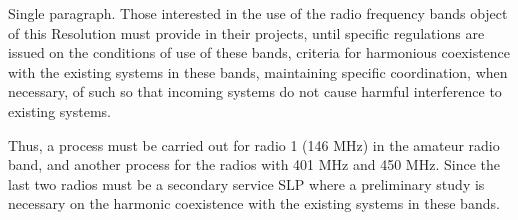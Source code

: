 Single paragraph. Those interested in the use of the radio frequency bands object of this Resolution must provide in their projects, until specific regulations are issued on the conditions of use of these bands, criteria for harmonious coexistence with the existing systems in these bands, maintaining specific coordination, when necessary, of such so that incoming systems do not cause harmful interference to existing systems.

Thus, a process must be carried out for radio 1 (146 MHz) in the amateur radio band, and another process for the radios with 401 MHz and 450 MHz. Since the last two radios must be a secondary service SLP where a preliminary study is necessary on the harmonic coexistence with the existing systems in these bands.